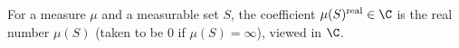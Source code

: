 For a measure $\mu$ and a measurable set $S$, the coefficient $\mu(S)^{\mathrm{real}}\in\C$ is the real number $\mu(S)$ (taken to be $0$ if $\mu(S)=\infty$), viewed in $\C$.
